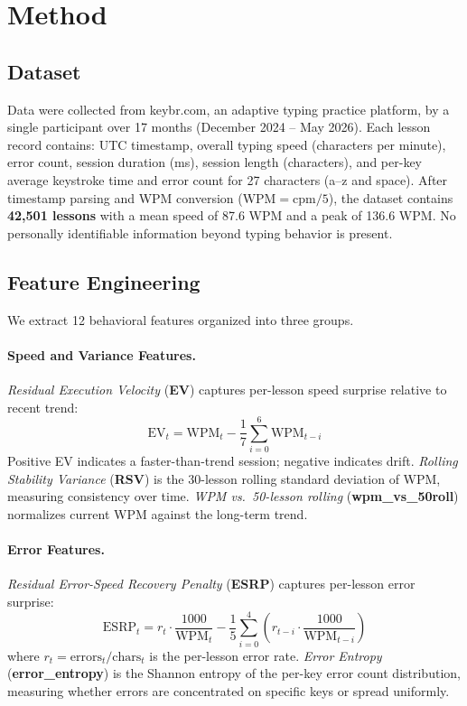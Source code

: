 \section{Method}
\label{sec:method}

\subsection{Dataset}
\label{sec:data}

Data were collected from keybr.com, an adaptive typing practice platform,
by a single participant over 17 months (December 2024 -- May 2026).
Each lesson record contains: UTC timestamp, overall typing speed (characters
per minute), error count, session duration (ms), session length (characters),
and per-key average keystroke time and error count for 27 characters
(a--z and space).
After timestamp parsing and WPM conversion (\(\text{WPM} = \text{cpm}/5\)),
the dataset contains \textbf{42,501 lessons} with a mean speed of 87.6 WPM
and a peak of 136.6 WPM.
No personally identifiable information beyond typing behavior is present.

\subsection{Feature Engineering}
\label{sec:features}

We extract 12 behavioral features organized into three groups.

\paragraph{Speed and Variance Features.}
\emph{Residual Execution Velocity} (\textbf{EV}) captures per-lesson speed
surprise relative to recent trend:
\begin{equation}
  \text{EV}_t = \text{WPM}_t - \frac{1}{7}\sum_{i=0}^{6}\text{WPM}_{t-i}
  \label{eq:ev}
\end{equation}
Positive EV indicates a faster-than-trend session; negative indicates drift.
\emph{Rolling Stability Variance} (\textbf{RSV}) is the 30-lesson rolling
standard deviation of WPM, measuring consistency over time.
\emph{WPM vs.\ 50-lesson rolling} (\textbf{wpm\_vs\_50roll}) normalizes
current WPM against the long-term trend.

\paragraph{Error Features.}
\emph{Residual Error-Speed Recovery Penalty} (\textbf{ESRP}) captures
per-lesson error surprise:
\begin{equation}
  \text{ESRP}_t = r_t \cdot \frac{1000}{\text{WPM}_t} -
  \frac{1}{5}\sum_{i=0}^{4}\!\left(r_{t-i}\cdot\frac{1000}{\text{WPM}_{t-i}}\right)
  \label{eq:esrp}
\end{equation}
where \(r_t = \text{errors}_t / \text{chars}_t\) is the per-lesson error rate.
\emph{Error Entropy} (\textbf{error\_entropy}) is the Shannon entropy of the
per-key error count distribution, measuring whether errors are concentrated on
specific keys or spread uniformly.

